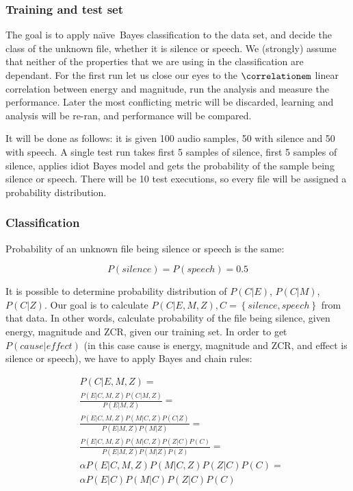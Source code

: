 \documentclass[english,11pt]{article}
\numberwithin{equation}{section}
\newcommand{\naive}{na\"{\i}ve\ }
\begin{document}
\subsubsection{Training and test set}

The goal is to apply \naive Bayes classification to the data set, and decide
the class of the unknown file, whether it is silence or speech. We (strongly)
assume that neither of the properties that we are using in the classification
are dependant. For the first run let us close our eyes to the
$\correlationem$ linear correlation between energy and magnitude, run the
analysis and measure the performance. Later the most conflicting metric will be
discarded, learning and analysis will be re-ran, and performance will be
compared.

It will be done as follows: it is given 100 audio samples, 50 with silence and
50 with speech. A single test run takes first 5 samples of silence, first 5
samples of silence, applies idiot Bayes model\cite{idiotbayes} and gets the
probability of the sample being silence or speech. There will be 10 test
executions, so every file will be assigned a probability distribution.

\subsubsection{Classification}

Probability of an unknown file being silence or speech is the same:

$$ P(silence) = P(speech) = 0.5 $$

It is possible to determine probability distribution of $P(C|E)$, $P(C|M)$,
$P(C|Z)$. Our goal is to calculate $ P(C | E, M, Z), C = \left\{ silence,
speech \right\}$ from that data. In other words, calculate probability of the
file being silence, given energy, magnitude and ZCR, given our training set. In
order to get $P(cause|effect)$ (in this case cause is energy, magnitude and
ZCR, and effect is silence or speech), we have to apply Bayes and chain rules:

\begin{align}
   & P(C | E, M, Z) = \\
   & \frac{ P(E|C,M,Z) P(C|M,Z) }{ P(E|M,Z) } = \\
   & \frac{ P(E|C,M,Z) P(M|C,Z) P(C|Z) }{ P(E|M,Z) P(M|Z) } = \\
   & \frac{ P(E|C,M,Z) P(M|C,Z) P(Z|C) P(C) }{ P(E|M,Z) P(M|Z) P(Z) } =
    \label{eq:chain_rule} \\
   & \alpha P(E|C,M,Z) P(M|C,Z) P(Z|C) P(C) = \label{eq:alpha} \\
   & \alpha P(E|C) P(M|C) P(Z|C) P(C) \label{eq:independence}
\end{align}
\end{document}
